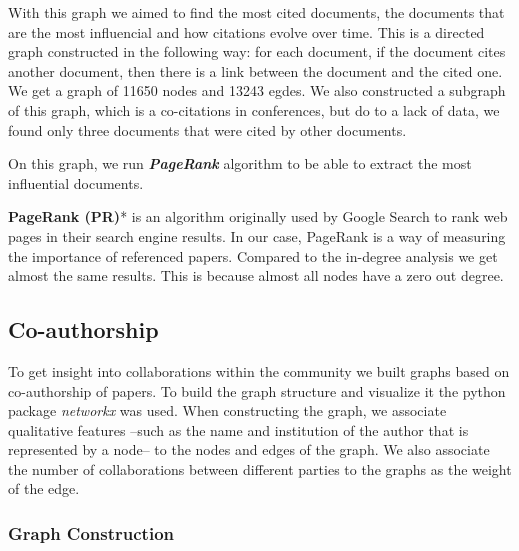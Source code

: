 \documentclass[article,twocolumn]{IEEEtran}
\begin{document}
With this graph we aimed to find the most cited documents, the documents
that are the most influencial and how citations evolve over time. This
is a directed graph constructed in the following way: for each document,
if the document cites another document, then there is a link between the
document and the cited one. We get a graph of 11650 nodes and 13243
egdes. We also constructed a subgraph of this graph, which is a
co-citations in conferences, but do to a lack of data, we found only
three documents that were cited by other documents.

On this graph, we run \textbf{\emph{PageRank}} algorithm to be able to
extract the most influential documents.

\textbf{PageRank (PR)}* is an algorithm originally used by Google Search
to rank web pages in their search engine results. In our case, PageRank
is a way of measuring the importance of referenced papers. Compared to
the in-degree analysis we get almost the same results. This is because
almost all nodes have a zero out degree.



    \hypertarget{co-authorship}{%
\subsection{Co-authorship}\label{co-authorship}}

To get insight into collaborations within the community we built graphs
based on co-authorship of papers. To build the graph structure and
visualize it the python package \emph{networkx} was used. When
constructing the graph, we associate qualitative features --such as the
name and institution of the author that is represented by a node-- to
the nodes and edges of the graph. We also associate the number of
collaborations between different parties to the graphs as the weight of
the edge.

\hypertarget{graph-construction}{%
\subsubsection{Graph Construction}\label{graph-construction}}
\end{document}
